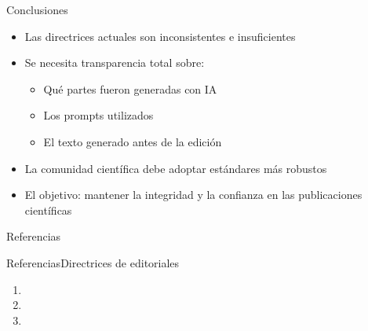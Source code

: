 \begin{frame}{Conclusiones}
    \begin{itemize}
        \item Las directrices actuales son inconsistentes e insuficientes
        \item Se necesita transparencia total sobre:
              \begin{itemize}
                  \item Qué partes fueron generadas con IA
                  \item Los prompts utilizados
                  \item El texto generado antes de la edición
              \end{itemize}
              \vspace{0.3cm}
        \item La comunidad científica debe adoptar estándares más robustos
        \item El objetivo: mantener la integridad y la confianza en las publicaciones científicas
    \end{itemize}
\end{frame}
\begin{frame}[allowframebreaks]{Referencias}{}
    \scriptsize
    \printbibliography[keyword={ethics},title={Paginas web}]
\end{frame}

\begin{frame}[allowframebreaks]{Referencias}{Directrices de editoriales}
    \tiny
    \printbibliography[keyword={online},title={Paginas web}]
\end{frame}


\begin{frame}[allowframebreaks]
    \tiny

    \printbibliography[title={}, prenote=nota3, keyword={example}, heading=subbibliography]


\end{frame}



\begin{frame}
    \begin{enumerate}\small
        \item {}
        \item {}
        \item {}
    \end{enumerate}
\end{frame}

